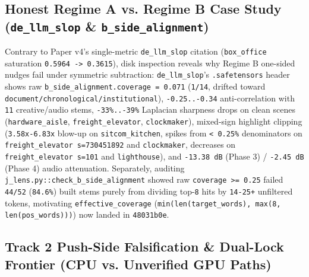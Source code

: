 \documentclass[10pt]{article}
\begin{document}
\subsection{Honest Regime A vs. Regime B Case Study (\texttt{de\_llm\_slop} \& \texttt{b\_side\_alignment})}

Contrary to Paper v4's single-metric \texttt{de\_llm\_slop} citation (\texttt{box\_office} saturation \texttt{0.5964 -> 0.3615}), disk inspection reveals why Regime B one-sided nudges fail under symmetric subtraction: \texttt{de\_llm\_slop}'s \texttt{.safetensors} header shows raw \texttt{b\_side\_alignment.coverage = 0.071} (\texttt{1/14}, drifted toward \texttt{document/chronological/institutional}), \texttt{-0.25..-0.34} anti-correlation with \texttt{11} creative/audio stems, \texttt{-33\%..-39\%} Laplacian sharpness drops on clean scenes (\texttt{hardware\_aisle}, \texttt{freight\_elevator}, \texttt{clockmaker}), mixed-sign highlight clipping (\texttt{3.58x-6.83x} blow-up on \texttt{sitcom\_kitchen}, spikes from \texttt{< 0.25\%} denominators on \texttt{freight\_elevator s=730451892} and \texttt{clockmaker}, decreases on \texttt{freight\_elevator s=101} and \texttt{lighthouse}), and \texttt{-13.38 dB} (Phase 3) / \texttt{-2.45 dB} (Phase 4) audio attenuation. Separately, auditing \texttt{j\_lens.py::check\_b\_side\_alignment} showed raw \texttt{coverage >= 0.25} failed \texttt{44/52} (\texttt{84.6\%}) built stems purely from dividing top-\texttt{8} hits by \texttt{14-25+} unfiltered tokens, motivating \texttt{effective\_coverage} (\texttt{min(len(target\_words), max(8, len(pos\_words)))}) now landed in \texttt{48031b0e}.

\subsection{Track 2 Push-Side Falsification \& Dual-Lock Frontier (CPU vs. Unverified GPU Paths)}
\end{document}
